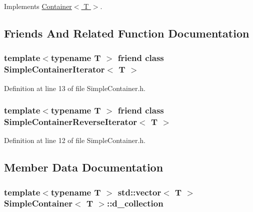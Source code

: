 Implements \hyperlink{class_container_abbd8ca2714a550351442f4410cf5736d}{Container$<$ T $>$}.



\subsection{Friends And Related Function Documentation}
\hypertarget{class_simple_container_a9abe836547cca50b94869af58a0901f7}{
\subsubsection[{SimpleContainerIterator$<$ T $>$}]{\setlength{\rightskip}{0pt plus 5cm}template$<$typename T $>$ friend class {\bf SimpleContainerIterator}$<$ T $>$}}
\label{class_simple_container_a9abe836547cca50b94869af58a0901f7}


Definition at line 13 of file SimpleContainer.h.

\hypertarget{class_simple_container_a0fe65b06d8220d8fcb1d34e1496b8399}{
\subsubsection[{SimpleContainerReverseIterator$<$ T $>$}]{\setlength{\rightskip}{0pt plus 5cm}template$<$typename T $>$ friend class {\bf SimpleContainerReverseIterator}$<$ T $>$}}
\label{class_simple_container_a0fe65b06d8220d8fcb1d34e1496b8399}


Definition at line 12 of file SimpleContainer.h.



\subsection{Member Data Documentation}
\hypertarget{class_simple_container_a0be5592282fc09b51a344d4083a7daf9}{
\subsubsection[{d\_\-collection}]{\setlength{\rightskip}{0pt plus 5cm}template$<$typename T $>$ std::vector$<$ T $>$ {\bf SimpleContainer}$<$ T $>$::{\bf d\_\-collection}}}
\label{class_simple_container_a0be5592282fc09b51a344d4083a7daf9}


